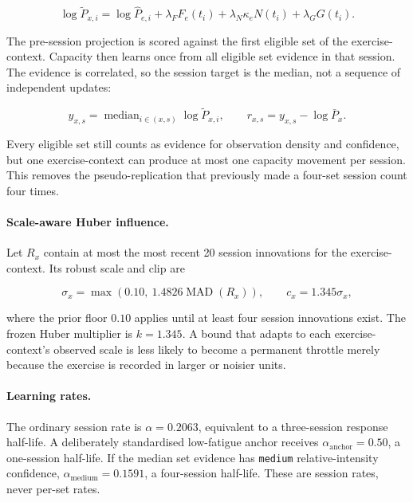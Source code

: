 \documentclass[11pt]{article}
\begin{document}
\begin{equation}
\log\widetilde P_{x,i}
=\log\widehat P_{e,i}
+\lambda_FF_e(t_i)+\lambda_N\kappa_eN(t_i)+\lambda_GG(t_i).
\end{equation}

The pre-session projection is scored against the first eligible set of the
exercise-context. Capacity then learns once from all eligible set evidence in
that session. The evidence is correlated, so the session target is the median,
not a sequence of independent updates:

\begin{equation}
y_{x,s}=\operatorname{median}_{i\in(x,s)}\log\widetilde P_{x,i},
\qquad r_{x,s}=y_{x,s}-\log\bar P_x.
\end{equation}

Every eligible set still counts as evidence for observation density and
confidence, but one exercise-context can produce at most one capacity movement
per session. This removes the pseudo-replication that previously made a
four-set session count four times.

\paragraph{Scale-aware Huber influence.} Let $R_x$ contain at most the most
recent 20 session innovations for the exercise-context. Its robust scale and
clip are

\begin{equation}
\sigma_x=\max\left(0.10,\ 1.4826\operatorname{MAD}(R_x)\right),
\qquad c_x=1.345\sigma_x,
\end{equation}

where the prior floor $0.10$ applies until at least four session innovations
exist. The frozen Huber multiplier is $k=1.345$. A bound that adapts to each
exercise-context's observed scale is less likely to become a permanent
throttle merely because the exercise is recorded in larger or noisier units.

\paragraph{Learning rates.} The ordinary session rate is $\alpha=0.2063$,
equivalent to a three-session response half-life. A deliberately standardised
low-fatigue anchor receives $\alpha_{\mathrm{anchor}}=0.50$, a one-session
half-life. If the median set evidence has \texttt{medium} relative-intensity
confidence, $\alpha_{\mathrm{medium}}=0.1591$, a four-session half-life. These
are session rates, never per-set rates.
\end{document}
